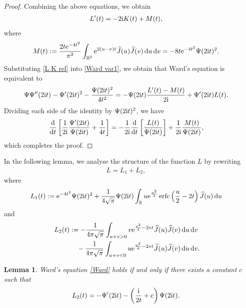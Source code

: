 \documentclass[pdftex]{sigma}
\numberwithin{equation}{section}
\newtheorem{Lemma}[Theorem]{Lemma}
\newcommand{\erfc}{\operatorname{erfc}}
\newcommand{\R}{{\mathbb R}}
\newcommand{\1}{\chi}
\def\wh{\widehat}
\begin{document}
\begin{proof}
	Combining the above equations, we obtain
	\begin{gather} \label{L K rel}
		L'(t)=-2{\rm i} K(t)+M(t),
	\end{gather}
	where
	\begin{gather*}
			M(t)
			:=\frac{2t {\rm e}^{-4t^2}}{\pi^2} \int_{\R^2 } {\rm e}^{2(u-v)t} \wh{J}(u) \wh{J}(v) \,{\rm d}u\,{\rm d}v=-8t {\rm e}^{-4t^2} \Psi(2{\rm i}t)^2.
	\end{gather*}
	Substituting \eqref{L K rel} into \eqref{Ward var1}, we obtain that Ward's equation is equivalent to
	\begin{gather*}
		\Psi \Psi''(2{\rm i}t) - \Psi'(2{\rm i}t)^2-\dfrac{\Psi(2{\rm i}t)^2}{4t^2}= -\Psi(2{\rm i}t) \frac{L'(t)-M(t)}{2{\rm i}}+\Psi'(2{\rm i}t) L(t).
	\end{gather*}
	Dividing each side of the identity by $\Psi(2{\rm i}t)^2$, we have
	\begin{gather*}
			\frac{{\rm d}}{{\rm d}t}\left[ \frac{1}{2{\rm i}} \frac{\Psi'(2{\rm i}t)}{\Psi(2{\rm i}t)}+\frac{1}{4t} \right]=-\frac{1}{2{\rm i}} \frac{{\rm d}}{{\rm d}t} \left[ \frac{L(t)}{\Psi(2{\rm i}t)} \right] +\frac{1}{2{\rm i}}\frac{M(t)}{\Psi(2{\rm i}t)},
		\end{gather*}
	which completes the proof.
\end{proof}

In the following lemma, we analyse the structure of the function $L$ by rewriting
\begin{gather}\label{L L1L2}
	L=L_1+L_2,
\end{gather}
where
\begin{gather} \label{L1}
	L_1(t):={\rm e}^{-4t^2} \Psi(2{\rm i}t)^2+	\frac{1}{4\sqrt{\pi}} \Psi(2{\rm i}t) \int_{\R} u {\rm e}^{ \frac{u^2}{4} } \erfc\left( \frac{u}{2}-2t \right) \wh{J}(u) \,{\rm d}u
\end{gather}
and
\begin{gather}
		L_2(t) :=-\frac{1}{4\pi\sqrt{\pi}} \int_{ u+v>0 } v {\rm e}^{ \frac{v^2}{4}-2vt } \wh{J}(u) \wh{J}(v) \,{\rm d}u\,{\rm d}v\nonumber\\
\hphantom{L_2(t) :=}{}
-\frac{1}{4\pi\sqrt{\pi}} \int_{ u+v<0 } u {\rm e}^{ \frac{u^2}{4}-2vt } \wh{J}(u) \wh{J}(v) \,{\rm d}u\,{\rm d}v.\label{L2}
	\end{gather}

\begin{Lemma}\label{Lem_Ward var3}
	Ward's equation \eqref{Ward} holds if and only if there exists a constant $c$ such that
	\begin{gather*}
		L_2(t)=-\Psi'(2{\rm i}t)-\left( \frac{{\rm i}}{2t}+c \right)\Psi(2{\rm i}t).
	\end{gather*}
\end{Lemma}
\end{document}
